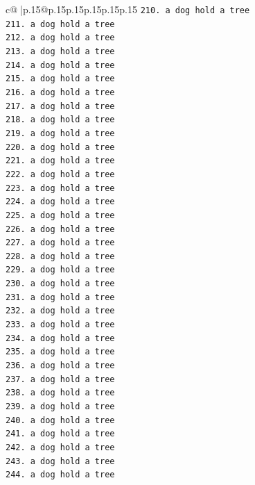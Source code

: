\documentclass{article}
\begin{document}
{\begin{supertabular}{c@{$\;$}|p{.15\linewidth}@{}p{.15\linewidth}p{.15\linewidth}p{.15\linewidth}p{.15\linewidth}p{.15\linewidth}}
{{{\texttt{210. a dog hold a tree} \\
\texttt{211. a dog hold a tree} \\
\texttt{212. a dog hold a tree} \\
\texttt{213. a dog hold a tree} \\
\texttt{214. a dog hold a tree} \\
\texttt{215. a dog hold a tree} \\
\texttt{216. a dog hold a tree} \\
\texttt{217. a dog hold a tree} \\
\texttt{218. a dog hold a tree} \\
\texttt{219. a dog hold a tree} \\
\texttt{220. a dog hold a tree} \\
\texttt{221. a dog hold a tree} \\
\texttt{222. a dog hold a tree} \\
\texttt{223. a dog hold a tree} \\
\texttt{224. a dog hold a tree} \\
\texttt{225. a dog hold a tree} \\
\texttt{226. a dog hold a tree} \\
\texttt{227. a dog hold a tree} \\
\texttt{228. a dog hold a tree} \\
\texttt{229. a dog hold a tree} \\
\texttt{230. a dog hold a tree} \\
\texttt{231. a dog hold a tree} \\
\texttt{232. a dog hold a tree} \\
\texttt{233. a dog hold a tree} \\
\texttt{234. a dog hold a tree} \\
\texttt{235. a dog hold a tree} \\
\texttt{236. a dog hold a tree} \\
\texttt{237. a dog hold a tree} \\
\texttt{238. a dog hold a tree} \\
\texttt{239. a dog hold a tree} \\
\texttt{240. a dog hold a tree} \\
\texttt{241. a dog hold a tree} \\
\texttt{242. a dog hold a tree} \\
\texttt{243. a dog hold a tree} \\
\texttt{244. a dog hold a tree} \\
}}}
\end{supertabular}}
\end{document}

